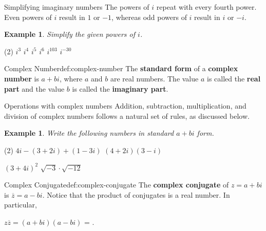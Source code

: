 \documentclass[a4paper, 12pt]{amsbook}
\newcounter{examplecounter}
\newtheorem{example}[examplecounter]{Example}
\begin{document}
\begin{objectivebox}{Simplifying imaginary numbers}{}
	The powers of $i$ repeat with every fourth power. Even powers of $i$ result in $1$ or $-1$, whereas odd powers of $i$ result in $i$ or $-i$.
\end{objectivebox}

\begin{example}
	Simplify the given powers of $i$.
\end{example}

\begin{tasks}(2)
	\task \quad $i^{3}$
	\task \quad $i^{4}$
	\task \quad $i^{5}$
	\task \quad $i^{6}$
	\task \quad $i^{103}$
	\task \quad $i^{-30}$
\end{tasks}

\vfill
\pagebreak

\begin{ColoredDefinition}{Complex Number}{def:complex-number}
	The \textbf{standard form} of a \textbf{complex number} is $a+bi$, where $a$ and $b$ are real numbers. The value $a$ is called the \textbf{real part} and the value $b$ is called the \textbf{imaginary part}.
\end{ColoredDefinition}

\begin{objectivebox}{Operations with complex numbers}{}
	Addition, subtraction, multiplication, and division of complex numbers follows a natural set of rules, as discussed below.
\end{objectivebox}

\begin{example}
	Write the following numbers in standard $a + bi$ form.
\end{example}


\begin{tasks}(2)
	\task \quad $4i-(3+2i)+(1-3i)$
	\task \quad $(4+2i)(3-i)$
 
 \addvspace{30mm}
 
	\task \quad $(3 + 4i)^{2}$
        \task \quad $\sqrt{-3}\cdot\sqrt{-12}$
\end{tasks}

\newpage

\begin{ColoredDefinition}{Complex Conjugate}{def:complex-conjugate}
	The {\bf complex conjugate} of $z=a+bi$ is $\overline{z} =a-bi$.
	Notice that the product of conjugates is a real number.  In particular,
	\begin{center}
		$z\overline{z}=(a+bi)(a-bi)$ = \hrulefill{}.
	\end{center}
\end{ColoredDefinition}
\end{document}
